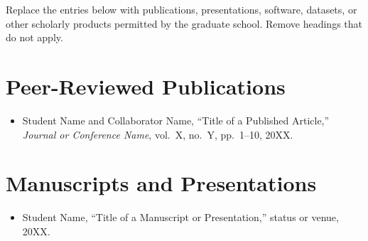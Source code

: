 Replace the entries below with publications, presentations, software, datasets, or other scholarly products permitted by the graduate school. Remove headings that do not apply.

\section*{Peer-Reviewed Publications}
\begin{itemize}
    \item Student Name and Collaborator Name, ``Title of a Published Article,'' \textit{Journal or Conference Name}, vol.~X, no.~Y, pp.~1--10, 20XX.
\end{itemize}

\section*{Manuscripts and Presentations}
\begin{itemize}
    \item Student Name, ``Title of a Manuscript or Presentation,'' status or venue, 20XX.
\end{itemize}
